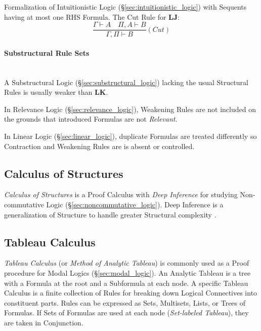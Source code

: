 Formalization of Intuitionistic Logic
(\S\ref{sec:intuitionistic_logic}) with Sequents having at most one
RHS Formula. The Cut Rule for $\mathbf{LJ}$:
\[
    \frac{
        \Gamma \vdash A \quad \Pi, A \vdash B
    }{
        \Gamma, \Pi \vdash B
    }(Cut)
\]

\paragraph{Substructural Rule Sets} \hfill \\

A Substructural Logic (\S\ref{sec:substructural_logic}) lacking the
usual Structural Rules is usually weaker than $\mathbf{LK}$.

In Relevance Logic (\S\ref{sec:relevance_logic}), Weakening Rules
are not included on the grounds that introduced Formulas are not
\emph{Relevant}.

In Linear Logic (\S\ref{sec:linear_logic}), duplicate Formulas are
treated differently so Contraction and Weakening Rules are is absent
or controlled.



\subsection{Calculus of Structures}

\emph{Calculus of Structures} is a Proof Calculus with \emph{Deep
  Inference} for studying Non-commutative Logic
(\S\ref{sec:noncommutative_logic}). Deep Inference is a
generalization of Structure to handle greater Structural complexity
\cite{schutte77}.



\subsection{Tableau Calculus}\label{sec:tableau_calculus}

\emph{Tableau Calculus} (or \emph{Method of Analytic Tableau}) is
commonly used as a Proof procedure for Modal Logics
(\S\ref{sec:modal_logic}). An Analytic Tableau is a tree with a
Formula at the root and a Subformula at each node. A specific Tableau
Calculus is a finite collection of Rules for breaking down Logical
Connectives into constituent parts. Rules can be expressed as Sets,
Multisets, Lists, or Trees of Formulas. If Sets of Formulas are used
at each node (\emph{Set-labeled Tableau}), they are taken in
Conjunction.

